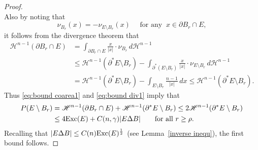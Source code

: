 \documentclass[reqno,11pt]{amsart}
\numberwithin{equation}{section}
\theoremstyle{remark}
\begin{document}
\begin{proof}
$$$$
Also by noting that
$$\nu_{B_r}(x) = -\nu_{E\setminus B_r}(x)\quad \text{ for any } \ x\in \partial B_r\cap E,$$
it follows from the divergence theorem that 
\begin{equation}
\label{eq:bound div1}
\begin{split}
\mathscr H^{n-1}(\partial B_r\cap E)&=\int_{\partial B_r\cap E}\frac{x}{|x|}\cdot \nu_{B_r} \, d\mathscr H^{n-1}\\
&\le  \mathscr H^{n-1}(\partial^* E\setminus B_r) - \int_{\partial^*(E\setminus B_r)} \frac{x}{|x|}\cdot \nu_{E\setminus B_r} \, d\mathscr H^{n-1}  \\
&=  \mathscr H^{n-1}(\partial^* E\setminus B_r) - \int_{E\setminus B_r} \frac{n-1}{|x|}\, dx\le  \mathscr H^{n-1}(\partial^* E\setminus B_r).
\end{split}
\end{equation}
Thus \eqref{eq:bound coarea1} and \eqref{eq:bound div1} imply that
\begin{align*}
P(E\setminus B_{r})&=\mathscr H^{n-1}(\partial B_r\cap E)+  \mathscr H^{n-1}(\partial^* E\setminus B_r)
 \leq 2\mathscr H^{n-1}(\partial^* E\setminus B_r)\\
&\leq 4 {\rm Exc}(E)+ C(n,\gamma)|E \Delta B|\qquad  \text{for all }r \geq \rho.
\end{align*}
Recalling that $|E \Delta B| \leq C(n) {\rm Exc}(E)^{\frac{1}2} $ (see Lemma~\ref{inverse inequ}), the first bound follows.


\end{proof}
\end{document}
